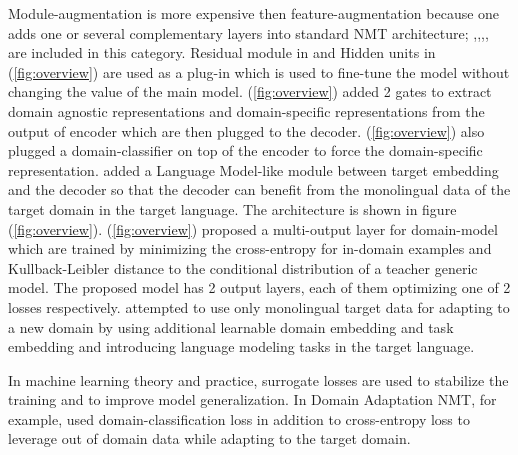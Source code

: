 \documentclass[12pt,a4paper,twoside]{report}
\theoremstyle{definition}
\begin{document}
Module-augmentation is more expensive then feature-augmentation because one adds one or several complementary layers into standard NMT architecture; \cite{bapna19simple},\cite{Michel18extreme},\cite{Zheng18multi},\cite{Vilar18learning}, \cite{Britz2017mixing} are included in this category. Residual module in \cite{bapna19simple} and Hidden units in \cite{Vilar18learning} (\ref{fig:overview}) are used as a plug-in which is used to fine-tune the model without
changing the value of the main model. \cite{Zheng18multi} (\ref{fig:overview}) added 2 gates to extract domain agnostic representations and domain-specific representations from the output of encoder which are then plugged to the decoder. \cite{Britz2017mixing} (\ref{fig:overview}) also plugged a domain-classifier on top of the encoder to force the domain-specific representation. \cite{domhan2017using} added a Language Model-like module between target embedding and the decoder so that the decoder can benefit from the monolingual data of the target domain in the target language. The architecture is shown in figure (\ref{fig:overview}). \cite{dakwle17fine} (\ref{fig:overview}) proposed a multi-output layer for domain-model which are trained by minimizing the cross-entropy for in-domain examples and Kullback-Leibler distance to
the conditional distribution of a teacher generic model. The proposed model has 2 output layers, each of them optimizing one of 2 losses respectively. \cite{Dou19Unsupervised} attempted to use only monolingual target data for adapting to a new domain by using additional learnable domain embedding and task embedding and introducing language modeling tasks in the target language. 


In machine learning theory and practice, surrogate losses are used to stabilize the training and to improve model generalization. In Domain Adaptation NMT, for example, \cite{Chen17cost} used domain-classification loss in addition to cross-entropy loss to leverage out of domain data while adapting to the target domain. 
\end{document}
